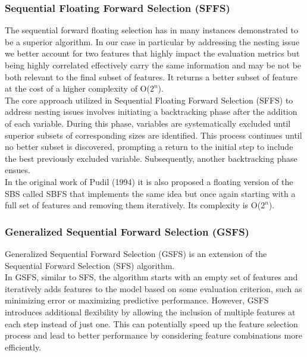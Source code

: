 \documentclass{Configuration_Files/PoliMi3i_thesis}
\begin{document}
\subsubsection{Sequential Floating Forward Selection (SFFS)}

The sequential forward floating selection has in many instances demonstrated to be a superior algorithm.\cite{reunanenOverfittingMakingComparisons} \cite{zongkerAlgorithmsFeatureSelection1996}
In our case in particular by addressing the nesting issue we better account for two features that highly impact the evaluation metrics but being highly correlated effectively carry the same information and may be not be both relevant to the final subset of features.
It returns a better subset of feature at the cost of a higher complexity of O($2^n$). \cite{kudoComparisonAlgorithmsThat2000} \\
The core approach utilized in Sequential Floating Forward Selection (SFFS) to address nesting issues involves initiating a backtracking phase after the addition of each variable. During this phase, variables are systematically excluded until superior subsets of corresponding sizes are identified. This process continues until no better subset is discovered, prompting a return to the initial step to include the best previously excluded variable. Subsequently, another backtracking phase ensues. \cite{reunanenOverfittingMakingComparisons} \cite{ pudilFloatingSearchMethods1994} \\ 
In the original work of Pudil (1994) it is also proposed a floating version of the SBS called SBFS that implements the same idea but once again starting with a full set of features and removing them iteratively. Its complexity is O($2^n$).

\subsubsection{Generalized Sequential Forward Selection (GSFS) }

Generalized Sequential Forward Selection (GSFS) is an extension of the Sequential Forward Selection (SFS) algorithm. \\
In GSFS, similar to SFS, the algorithm starts with an empty set of features and iteratively adds features to the model based on some evaluation criterion, such as minimizing error or maximizing predictive performance. However, GSFS introduces additional flexibility by allowing the inclusion of multiple features at each step instead of just one. This can potentially speed up the feature selection process and lead to better performance by considering feature combinations more efficiently.
\end{document}
